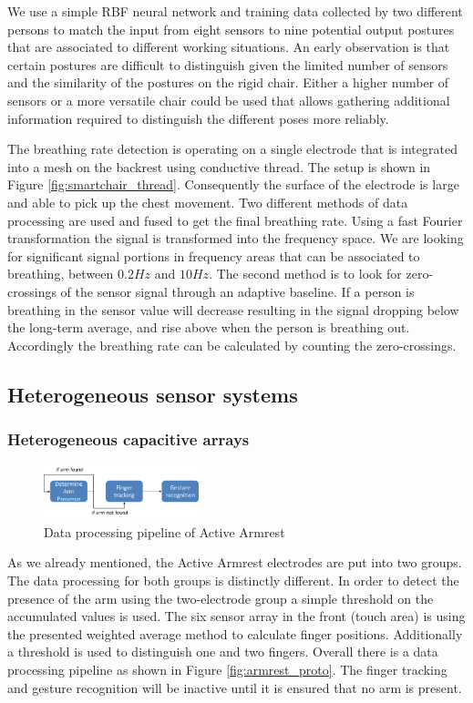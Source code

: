 We use a simple RBF neural network and training data collected by two different persons to match the input from eight sensors to nine potential output postures that are associated to different working situations. An early observation is that certain postures are difficult to distinguish given the limited number of sensors and the similarity of the postures on the rigid chair. Either a higher number of sensors or a more versatile chair could be used that allows gathering additional information required to distinguish the different poses more reliably. 

The breathing rate detection is operating on a single electrode that is integrated into a mesh on the backrest using conductive thread. The setup is shown in Figure \ref{fig:smartchair_thread}. Consequently the surface of the electrode is large and able to pick up the chest movement. Two different methods of data processing are used and fused to get the final breathing rate. Using a fast Fourier transformation the signal is transformed into the frequency space. We are looking for significant signal portions in frequency areas that can be associated to breathing, between $0.2Hz$ and $10Hz$. The second method is to look for zero-crossings of the sensor signal through an adaptive baseline. If a person is breathing in the sensor value will decrease resulting in the signal dropping below the long-term average, and rise above when the person is breathing out. Accordingly the breathing rate can be calculated by counting the zero-crossings.
\subsection{Heterogeneous sensor systems}
\subsubsection{Heterogeneous capacitive arrays}
\begin{figure}[h]
\centering
\includegraphics[width=0.4\textwidth]{images/armrest_dataproc}
\caption{Data processing pipeline of Active Armrest}
\label{fig:armrest_dataproc}
\end{figure}
As we already mentioned, the Active Armrest electrodes are put into two groups. The data processing for both groups is distinctly different. In order to detect the presence of the arm using the two-electrode group a simple threshold on the accumulated values is used. The six sensor array in the front (touch area) is using the presented weighted average method to calculate finger positions. Additionally a threshold is used to distinguish one and two fingers. Overall there is a data processing pipeline as shown in Figure \ref{fig:armrest_proto}. The finger tracking and gesture recognition will be inactive until it is ensured that no arm is present. 

